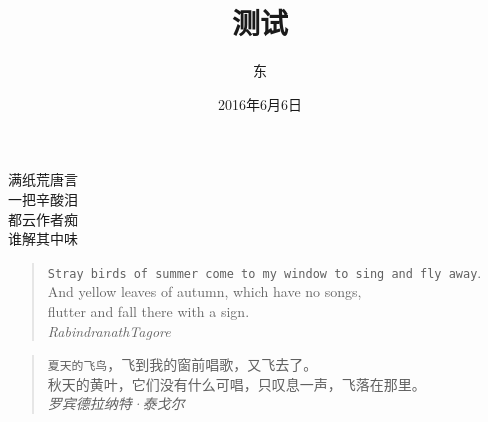 \documentclass[12pt, a4paper]{article}
\title{测试}
\author{东}
\date{2016年6月6日}
\begin{document}
\maketitle
\begin{center}
满纸荒唐言\\
一把辛酸泪\\
都云作者痴\\
谁解其中味\\ 
\end{center}
\begin{verse}
\texttt{Stray birds of summer come to my window to sing and fly away}. \\
\textsf{And yellow leaves of autumn, which have no songs}, \\
\textrm{flutter and fall there with a sign}.\\
\hfill \emph{RabindranathTagore}
\end{verse}
\begin{verse}
\texttt{夏天的飞鸟}，\textsf{飞到我的窗前唱歌}，\textrm{又飞去了}。\\
秋天的黄叶，它们没有什么可唱，只叹息一声，飞落在那里。\\
\hfill \emph{罗宾德拉纳特·泰戈尔}
\end{verse}
\end{document}
